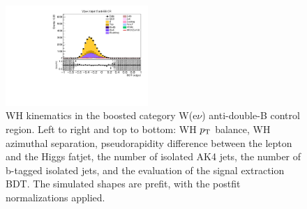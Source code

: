 \begin{figure}[tbp]
\begin{center}
    \includegraphics[width=0.48\textwidth]{figures/wlnhbb2016/boosted/WenWHTT1bFJCR_bdtValue.pdf}
    \caption{WH kinematics in the boosted category W(e$\nu$) anti-double-B control region.
    Left to right and top to bottom: WH $p_{\mathrm{T}}$ balance, WH azimuthal separation,
    pseudorapidity difference between the lepton and the Higgs fatjet,
    the number of isolated AK4 jets, the number of b-tagged isolated jets,
    and the evaluation of the signal extraction BDT.
    The simulated shapes are prefit, with the postfit normalizations applied.}
    \label{fig:boost_WenTT1b_WH}
  \end{center}
\end{figure}
\clearpage

